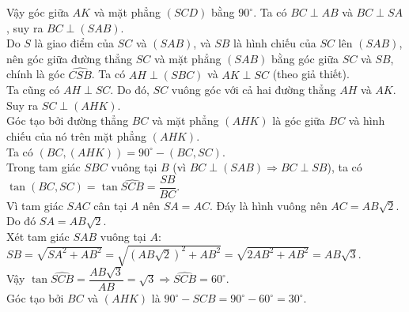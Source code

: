 \begin{ex}
{\begin{itemchoice}
			Vậy góc  giữa $AK$ và mặt phẳng $(SCD)$ bằng $90^\circ$.
			\itemch 
			Ta có $BC\perp  AB$ và $BC\perp SA$, suy ra $BC\perp \left(SAB\right)$. \\
			Do $S$ là giao điểm của $SC$ và $\left(SAB\right)$, và $SB$ là hình chiếu của  $SC$ lên $\left(SAB\right)$, nên góc giữa đường thẳng $SC$ và mặt phẳng $\left(SAB\right)$ bằng góc giữa $SC$ và $SB$, chính là góc $\widehat{CSB}$.
			 \itemch
			Ta có  $AH\perp \left(SBC\right)$ và $AK\perp SC$ (theo giả thiết). \\
			Ta cũng có $AH\perp SC$. Do đó, $SC$ vuông  góc với cả hai đường thẳng $AH$ và $AK$. \\
			 Suy ra $SC\perp \left(AHK\right)$. \\
			 Góc tạo bởi đường thẳng $BC$ và mặt phẳng $\left(AHK\right)$ là góc giữa $BC$ và hình chiếu của nó trên mặt phẳng $\left(AHK\right)$. \\
			 Ta có $\left(BC, \left(AHK\right)\right) = 90^\circ - \left(BC, SC\right)$. \\
			Trong tam giác $SBC$  vuông tại $B$ (vì $BC\perp (SAB) \Rightarrow BC\perp SB$), ta có $\tan\left(BC,SC\right) = \tan\widehat{SCB}=\dfrac{SB}{BC}$. \\
			Vì tam giác $SAC$ cân  tại $A$ nên $SA=AC$. Đáy là hình vuông nên $AC=AB\sqrt{2}$. \\
			Do đó  $SA=AB\sqrt{2}$. \\
			Xét tam giác $SAB$ vuông  tại $A$: $SB=\sqrt{SA^2+AB^2}=\sqrt{\left(AB\sqrt{2}\right)^2+AB^2}=\sqrt{2AB^2+AB^2}=AB\sqrt{3}$. \\
			Vậy $\tan  \widehat{SCB}=\dfrac{AB\sqrt{3}}{AB}=\sqrt{3} \Rightarrow \widehat{SCB}=60^\circ$. \\
			Góc tạo bởi  $BC$ và $(AHK)$ là $90^\circ - \widehat{SCB} = 90^\circ-60^\circ=30^\circ$.
		\end{itemchoice}
	} 
\end{ex}
